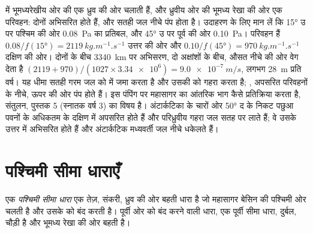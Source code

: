  में भूमध्यरेखीय ओर की  एक  ध्रुव की ओर चलाती हैं, और ध्रुवीय ओर की  भूमध्य रेखा की ओर एक परिवहन: दोनों अभिसरित होते हैं, और सतही जल नीचे पंप होता है। उदाहरण के लिए मान लें कि \ang{15} उ पर पश्चिम की ओर \qty{0.08}{Pa} का प्रतिबल, और \ang{45} उ पर पूर्व की ओर \qty{0.10}{Pa}।
परिवहन हैं $0.08/f(\ang{15}) = \qty{2119}{kg.m^{-1}.s^{-1}}$ उत्तर की ओर और $0.10/f(\ang{45}) =
\qty{970}{kg.m^{-1}.s^{-1}}$ दक्षिण की ओर। दोनों के बीच \qty{3340}{km} पर अभिसरण, दो अक्षांशों के बीच, औसत नीचे की ओर वेग देता है
$(2119 + 970)/(1027 \times \num{3.34e6}) = \qty{9.0e-7}{m/s}$, लगभग \qty{28}{m} प्रति वर्ष। यह धीमा  सतही गरम जल को  में जमा करता है और उसकी  को गहरा करता है; , अपसरित परिवहनों के नीचे, ऊपर की ओर पंप होते हैं। इस पंपिंग पर महासागर का आंतरिक भाग कैसे प्रतिक्रिया करता है,  संतुलन, पुस्तक 5 (स्नातक वर्ष 3) का विषय है। अंटार्कटिका के चारों ओर  \ang{50} द के निकट पछुआ पवनों के अधिकतम के दक्षिण में अपसरित होते हैं और परिध्रुवीय गहरा जल सतह पर लाते हैं; वे उसके उत्तर में अभिसरित होते हैं और अंटार्कटिक मध्यवर्ती जल नीचे धकेलते हैं।

\section{पश्चिमी सीमा धाराएँ}\label{sec:b1:ocean-circulation:wbc}

\begin{definition}[पश्चिमी सीमा धारा]\label{def:b1:ocean-circulation:wbc}
एक \emph{पश्चिमी सीमा धारा} एक तेज़, संकरी, ध्रुव की ओर बहती धारा है जो महासागर बेसिन की पश्चिमी ओर चलती है और उसके  को बंद करती है। पूर्वी ओर  को बंद करने वाली धारा, एक पूर्वी सीमा धारा, दुर्बल, चौड़ी है और भूमध्य रेखा की ओर बहती है।
\end{definition}

